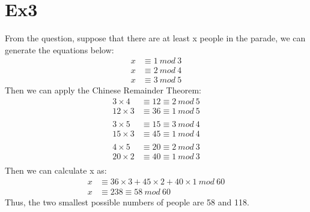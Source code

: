 \documentclass[12pt, a4paper]{article}
\begin{document}
\section{Ex3}
From the question, suppose that there are at least x people in the parade, we can generate the equations below:
\begin{align*}
    x &\equiv 1\ mod\ 3\\
    x &\equiv 2\ mod\ 4\\
    x &\equiv 3\ mod\ 5
\end{align*}
Then we can apply the Chinese Remainder Theorem:
\begin{align*}
    3\times 4 &\equiv 12 \equiv 2\ mod\ 5\\
    12\times 3 &\equiv 36 \equiv 1\ mod\ 5\\
    \\
    3\times 5 &\equiv 15 \equiv 3\ mod\ 4\\
    15\times 3 &\equiv 45 \equiv 1\ mod\ 4\\
    \\
    4\times 5 &\equiv 20 \equiv 2\ mod\ 3\\
    20\times 2 &\equiv 40 \equiv 1\ mod\ 3\\
\end{align*}
Then we can calculate x as:
\begin{align*}
    x &\equiv 36\times 3 + 45\times 2 + 40\times 1\ mod\ 60\\
    x &\equiv 238 \equiv 58\ mod\ 60
\end{align*}
Thus, the two smallest possible numbers of people are 58 and 118.
\end{document}
